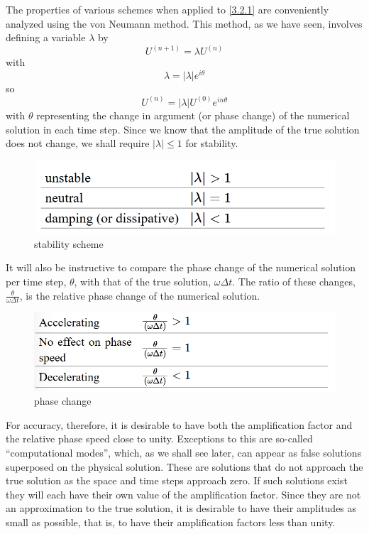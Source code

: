 The properties of various schemes when applied to \ref{3.2.1} are conveniently analyzed using the von Neumann method. This method, as we have seen, involves defining a variable $\lambda$ by
\begin{equation}\label{3.2.3}
	U^{(n+1)}=\lambda U^{(n)}
\end{equation}
with
$$\lambda=|\lambda|e^{i\theta}$$
so
\begin{equation}\label{3.2.5}
	U^{(n)}=|\lambda|U^{(0)}e^{in\theta}
\end{equation}
with $\theta$ representing the change in argument (or phase change) of the numerical solution in each time step. Since we know that the amplitude of the true solution does not change, we shall require $|\lambda|\leq 1$ for stability.
\begin{figure}[h]
	\centering
	\includegraphics[width=0.50\linewidth]{uploads/Screenshot 2024-11-11 225800.png}
	\caption{stability scheme}
	\label{fig:stab scheme}
\end{figure}
It will also be instructive to compare the phase change of the numerical solution per time step, $\theta$, with that of the true solution, $\omega\Delta t$. The ratio of these changes, $\frac{\theta}{\omega\Delta t}$, is the relative phase change of the numerical solution.
\begin{figure}[h]
	\centering
	\includegraphics[width=0.50\linewidth]{uploads/Screenshot 2024-11-11 230012.png}
	\caption{phase change}
	\label{fig:phase change}
\end{figure}
For accuracy, therefore, it is desirable to have both the amplification factor and the relative phase speed close to unity. Exceptions to this are so-called “computational modes”, which, as we shall see later, can appear as false solutions superposed on the physical solution. These are solutions that do not approach the true solution as the space and time steps approach zero. If such solutions exist they will each have their own value of the amplification factor. Since they are not an approximation to the true solution, it is desirable to have their amplitudes as small as possible, that is, to have their amplification factors less than unity.


